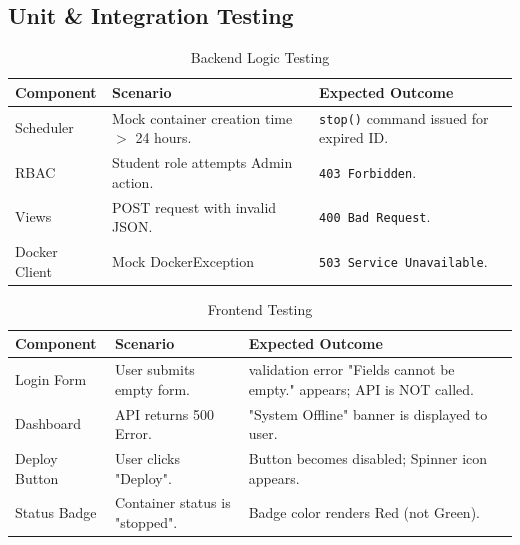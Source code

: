 \documentclass[12pt,titlepage]{article}
\begin{document}
\subsection{Unit \& Integration Testing}
\begin{table}[h!]
\centering
\begin{tabular}{|l|l|p{5cm}|>{\raggedright\arraybackslash}p{5cm}|}
\hline
\textbf{Component} & \textbf{Scenario} & \textbf{Expected Outcome} \\ \hline
Scheduler & Mock container creation time $>$ 24 hours. & \texttt{stop()} command issued for expired ID. \\ \hline
RBAC & Student role attempts Admin action. & \texttt{403 Forbidden}. \\ \hline
Views & POST request with invalid JSON. &  \texttt{400 Bad Request}. \\ \hline
Docker Client & Mock DockerException & \texttt{503 Service Unavailable}. \\ \hline
\end{tabular}
\caption{Backend Logic Testing}
\label{table:unit-tests}
\end{table}

\begin{table}[h!]
\centering
\begin{tabular}{|l|l|>{\raggedright\arraybackslash}p{5cm}|>{\raggedright\arraybackslash}p{5cm}|}
\hline
\textbf{Component} & \textbf{Scenario} & \textbf{Expected Outcome} \\ \hline
Login Form & User submits empty form. & validation error "Fields cannot be empty." appears; API is NOT called. \\ \hline
Dashboard & API returns 500 Error. & "System Offline" banner is displayed to user. \\ \hline
Deploy Button & User clicks "Deploy". & Button becomes disabled; Spinner icon appears. \\ \hline
Status Badge & Container status is "stopped". & Badge color renders Red (not Green). \\ \hline
\end{tabular}
\caption{Frontend Testing}
\label{table:frontend-unit-tests}
\end{table}
\end{document}
